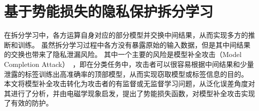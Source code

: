 \chapter{基于势能损失的隐私保护拆分学习}
\label{chap:peloss}
在拆分学习中，各方运算自身对应的部分模型并交换中间结果，从而实现多方的推断和训练。
%
虽然拆分学习过程中各方没有暴露原始的输入数据，但是其中间结果的交换也带来了隐私泄漏风险。
%
其中一个主要的风险是模型补全攻击（Model Completion Attack）~\cite{fucong2022label_infer_attack}，即在分类任务中，攻击者可以很容易根据中间结果和少量泄露的标签训练出高准确率的顶部模型，从而实现窃取模型或标签信息的目的。
%
本文将模型补全攻击转化为攻击者的有监督或无监督学习问题，从泛化误差角度对其进行了分析，并由电磁学现象启发，提出了势能损失函数，对模型补全攻击实现了有效的防护。
%





